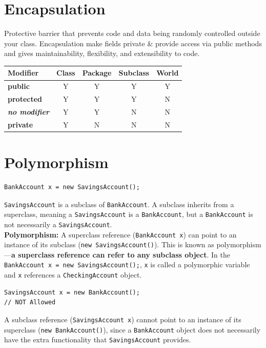 \documentclass[letterpaper,12pt]{article}
\begin{document}
\section{Encapsulation}
Protective barrier that prevents code and data being randomly controlled outside your class. Encapsulation make fields private \& provide access via public methods and gives maintainability, flexibility, and extensibility to code.
\begin{table}[h]
    \centering
    \begin{tabular}{|l|c|c|c|c|}
        \hline
        \textbf{Modifier} & \textbf{Class} & \textbf{Package} & \textbf{Subclass} & \textbf{World} \\
        \hline
        \textbf{public} & Y & Y & Y & Y \\
        \hline
        \textbf{protected} & Y & Y & Y & N \\
        \hline
        \textbf{\textit{no modifier}} & Y & Y & N & N \\
        \hline
        \textbf{private} & Y & N & N & N \\
        \hline
    \end{tabular}
\end{table}

\section{Polymorphism}
\begin{verbatim}
BankAccount x = new SavingsAccount();
\end{verbatim}
\texttt{SavingsAccount} is a subclass of \texttt{BankAccount}. A subclass inherits from a superclass, meaning a \texttt{SavingsAccount} is a \texttt{BankAccount}, but a \texttt{BankAccount} is not necessarily a \texttt{SavingsAccount}.\\
\textbf{Polymorphism:} A superclass reference (\texttt{BankAccount x}) can point to an instance of its subclass (\texttt{new SavingsAccount()}). This is known as polymorphism—\textbf{a superclass reference can refer to any subclass object}. In the \texttt{BankAccount x = new SavingsAccount();}, \texttt{x} is called a polymorphic variable and \texttt{x} references a \texttt{CheckingAccount} object.
\begin{verbatim}
SavingsAccount x = new BankAccount();
// NOT Allowed
\end{verbatim}
A subclass reference (\texttt{SavingsAccount x}) cannot point to an instance of its superclass (\texttt{new BankAccount()}), since a \texttt{BankAccount} object does not necessarily have the extra functionality that \texttt{SavingsAccount} provides.
\end{document}
